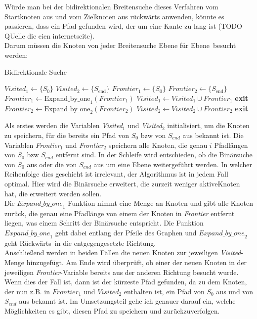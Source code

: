 \documentclass[a4paper,10pt,ngerman]{scrartcl}
\begin{document}
Würde man bei der bidirektionalen Breitensuche dieses Verfahren vom Startknoten aus und vom Zielknoten aus rückwärts anwenden, könnte es passieren, dass ein Pfad gefunden wird, der um eine Kante zu lang ist (TODO QUelle die eien internetseite). \\
Darum müssen die Knoten von jeder Breitensuche \glqq Ebene für Ebene\grqq~besucht werden:
\begin{algorithm}[H]
\caption{Bidirektionale Suche}
\label{alg:bidirectional-search}
\begin{algorithmic}[1]
  \State $Visited_{1} \gets \{S_{0}\}$
  \State $Visited_{2} \gets \{S_{\text{end}}\}$
  \State $Frontier_{1} \gets \{S_{0}\}$
  \State $Frontier_{2} \gets \{S_{\text{end}}\}$
      \State $Frontier_{1} \gets \text{Expand\_by\_one}_1(Frontier_{1})$
      \State $Visited_{1} \gets Visited_{1} \cup Frontier_{1}$
        \State \textbf{exit} 
      \EndIf
    \Else
      \State $Frontier_{2} \gets \text{Expand\_by\_one}_2(Frontier_{2})$
      \State $Visited_{2} \gets Visited_{2} \cup Frontier_{2}$
        \State \textbf{exit} 
      \EndIf
    \EndIf
  \EndWhile
\end{algorithmic}
\end{algorithm}
Als erstes werden die Variablen \textit{Visited$_1$} und \textit{Visited$_2$} initialisiert, um die Knoten zu speichern, für die bereits ein Pfad von $S_0$ bzw von $S_{end}$ aus bekannt ist. Die Variablen \textit{Frontier$_1$} und \textit{Frontier$_2$} speichern alle Knoten, die genau $i$ Pfadlängen von $S_0$ bzw $S_{end}$ entfernt sind. In der Schleife wird entschieden, ob die Binärsuche von $S_0$ aus oder die von $S_{end}$ aus um eine Ebene weitergeführt werden. In welcher Reihenfolge dies geschieht ist irrelevant, der Algorithmus ist in jedem Fall optimal. Hier wird die Binärsuche erweitert, die zurzeit weniger \glqq aktive\grqq Knoten hat, die erweitert werden sollen.\\
Die $\textit{Expand\_by\_one}_1$ Funktion nimmt eine Menge an Knoten und gibt alle Knoten zurück, die genau eine Pfadlänge von einem der Knoten in \textit{Frontier} entfernt liegen, was einem Schritt der Binärsuche entspricht. Die Funktion $\textit{Expand\_by\_one}_1$ geht dabei entlang der Pfeile des Graphen und $\textit{Expand\_by\_one}_2$ geht \glqq Rückwärts\grqq~in die entgegengesetzte Richtung. \\
Anschließend werden in beiden Fällen die neuen Knoten zur jeweiligen \textit{Visited}-Menge hinzugefügt.
Am Ende wird überprüft, ob einer der neuen Knoten in der jeweiligen \textit{Frontier}-Variable bereits aus der anderen Richtung besucht wurde. Wenn dies der Fall ist, dann ist der kürzeste Pfad gefunden, da zu dem Knoten, der nun z.B. in $\textit{Frontier}_1$ und $\textit{Visited}_2$ enthalten ist, ein Pfad von $S_0$ aus und von $S_{end}$ aus bekannt ist. Im Umsetzungsteil gehe ich genauer darauf ein, welche Möglichkeiten es gibt, diesen Pfad zu speichern und zurückzuverfolgen.
\end{document}
